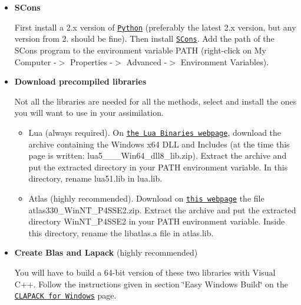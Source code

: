 \documentclass{tufte-book}
\begin{document}
\begin{itemize}
\item {\bfseries \-S\-Cons} \par
 \-First install a 2.\-x version of \href{http://www.python.org/download/}{\tt \-Python} (preferably the latest 2.\-x version, but any version from 2. should be fine). \-Then install \href{http://www.scons.org/}{\tt \-S\-Cons}. \-Add the path of the \-S\-Cons program to the environment variable {\ttfamily \-P\-A\-T\-H} (right-\/click on \-My \-Computer -\/$>$ \-Properties -\/$>$ \-Advanced -\/$>$ \-Environment \-Variables).


\item {\bfseries \-Download precompiled libraries} \par


\-Not all the libraries are needed for all the methods, select and install the ones you will want to use in your assimilation.


\begin{itemize}
\item \-Lua (always required). \-On \href{http://luabinaries.sourceforge.net/download.html}{\tt the \-Lua \-Binaries webpage}, download the archive containing the \-Windows x64 \-D\-L\-L and \-Includes (at the time this page is written\-: {\ttfamily lua5\-\_\-\_\-\_\-\-Win64\-\_\-dll8\-\_\-lib.\-zip}). \-Extract the archive and put the extracted directory in your \-P\-A\-T\-H environment variable. \-In this directory, rename {\ttfamily lua51.\-lib} in {\ttfamily lua.\-lib}.
\end{itemize}


\begin{itemize}
\item \-Atlas (highly recommended). \-Download on \href{http://www.netlib.org/atlas/archives/windows/}{\tt this webpage} the file {\ttfamily atlas330\-\_\-\-Win\-N\-T\-\_\-\-P4\-S\-S\-E2.\-zip}. \-Extract the archive and put the extracted directory {\ttfamily \-Win\-N\-T\-\_\-\-P4\-S\-S\-E2} in your {\ttfamily \-P\-A\-T\-H} environment variable. \-Inside this directory, rename the {\ttfamily libatlas.\-a} file in {\ttfamily atlas.\-lib}. \par

\end{itemize}


\item {\bfseries \-Create \-Blas and \-Lapack} (highly recommended) \par


\-You will have to build a 64-\/bit version of these two libraries with \-Visual \-C++. \-Follow the instructions given in section \char`\"{}\-Easy Windows Build\char`\"{} on the \href{http://icl.cs.utk.edu/lapack-for-windows/clapack/#build}{\tt \-C\-L\-A\-P\-A\-C\-K for \-Windows} page.


\end{itemize}
\end{document}
